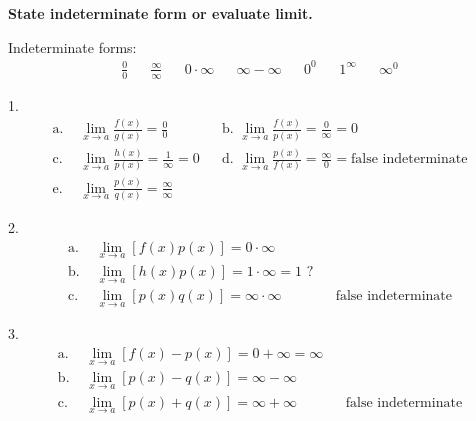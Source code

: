 \documentclass{article}
\begin{document}
\begin{description} %
  \setlength\itemsep{5em}

  \item\textbf{State indeterminate form or evaluate limit.}

        Indeterminate forms:
        \begin{align*}
          \frac{0}{0} &  & \frac{\infty}{\infty} &  & 0 \cdot \infty &  & \infty - \infty &  & 0^0 &  & 1^{\infty} &  & \infty^0
        \end{align*}
        \begin{description}
          \setlength\itemsep{2em}
          \item 1.
                \begin{align*}
                  \text{a. } & \lim_{x\to a} \frac{f(x)}{g(x)} = \frac{0}{0}           &  & \text{b. } \lim_{x\to a} \frac{f(x)}{p(x)} = \frac{0}{\infty} =  0                         \\
                  \text{c. } & \lim_{x\to a} \frac{h(x)}{p(x)} = \frac{1}{\infty} = 0  &  & \text{d. } \lim_{x\to a} \frac{p(x)}{f(x)} = \frac{\infty}{0} = \text{false indeterminate} \\
                  \text{e. } & \lim_{x\to a} \frac{p(x)}{q(x)} = \frac{\infty}{\infty}
                \end{align*}
          \item 2.
                \begin{align*}
                  \text{a. } & \lim_{x\to a} [f(x)p(x)] = 0 \cdot \infty                                             \\
                  \text{b. } & \lim_{x\to a} [h(x)p(x)]= 1 \cdot \infty = 1\text{ ?}                                 \\
                  \text{c. } & \lim_{x\to a} [p(x)q(x)] = \infty \cdot \infty        &  & \text{false indeterminate}
                \end{align*}
          \item 3.
                \begin{align*}
                  \text{a. } & \lim_{x\to a} [f(x) - p(x)] = 0 + \infty = \infty                                 \\
                  \text{b. } & \lim_{x\to a} [p(x) - q(x)]= \infty - \infty      &  &                            \\
                  \text{c. } & \lim_{x\to a} [p(x) + q(x)] = \infty + \infty     &  & \text{false indeterminate}

\end{align*}
\end{description}
\end{description}
\end{document}
